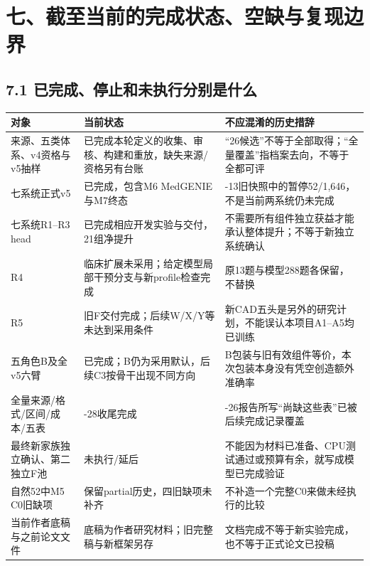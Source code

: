 \documentclass[
  11pt,
  a4paper,
]{article}
\newcounter{none} %
\begin{document}
\label{current-status}

\section{七、截至当前的完成状态、空缺与复现边界}\label{ux4e03ux622aux81f3ux5f53ux524dux7684ux5b8cux6210ux72b6ux6001ux7a7aux7f3aux4e0eux590dux73b0ux8fb9ux754c}

\subsection{7.1
已完成、停止和未执行分别是什么}\label{ux5df2ux5b8cux6210ux505cux6b62ux548cux672aux6267ux884cux5206ux522bux662fux4ec0ux4e48}

{\def\LTcaptype{none} %
\begin{longtable}[]{@{}
  >{\raggedright\arraybackslash}p{}
  >{\raggedright\arraybackslash}p{}
  >{\raggedright\arraybackslash}p{}@{}}
\toprule\noalign{}
\begin{minipage}[b]{\linewidth}\raggedright
对象
\end{minipage} & \begin{minipage}[b]{\linewidth}\raggedright
当前状态
\end{minipage} & \begin{minipage}[b]{\linewidth}\raggedright
不应混淆的历史措辞
\end{minipage} \\
\midrule\noalign{}
\endhead
\bottomrule\noalign{}
\endlastfoot
来源、五类体系、v4资格与v5抽样 &
已完成本轮定义的收集、审核、构建和重放，缺失来源/资格另有台账 &
``26候选''不等于全部取得；``全量覆盖''指档案去向，不等于全都可评 \\
七系统正式v5 & 已完成，包含M6 MedGENIE与M7终态 &
09-13旧快照中的暂停52/1,646，不是当前两系统仍未完成 \\
七系统R1--R3 head & 已完成相应开发实验与交付，21组净提升 &
不需要所有组件独立获益才能承认整体提升；不等于新独立系统确认 \\
R4 & 临床扩展未采用；给定模型局部干预分支与新profile检查完成 &
原13题与模型288题各保留，不替换 \\
R5 & 旧F交付完成；后续W/X/Y等未达到采用条件 &
新CAD五头是另外的研究计划，不能误认本项目A1--A5均已训练 \\
五角色B及全v5六臂 & 已完成；B仍为采用默认，后续C3按骨干出现不同方向 &
B包装与旧有效组件等价，本次包装本身没有凭空创造额外准确率 \\
全量来源/格式/区间/成本/五表 & 09-28收尾完成 &
09-26报告所写``尚缺这些表''已被后续完成记录覆盖 \\
最终新家族独立确认、第二独立F池 & 未执行/延后 &
不能因为材料已准备、CPU测试通过或预算有余，就写成模型已完成验证 \\
自然52中M5 C0旧缺项 & 保留partial历史，四旧缺项未补齐 &
不补造一个完整C0来做未经执行的比较 \\
当前作者底稿与之前论文文件 & 底稿为作者研究材料；旧完整稿与新框架另存 &
文档完成不等于新实验完成，也不等于正式论文已投稿 \\
\end{longtable}
}
\end{document}
